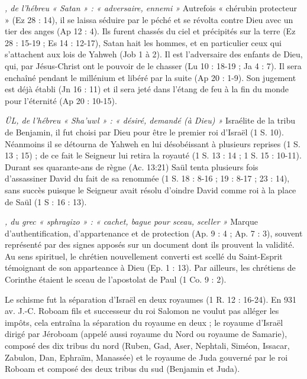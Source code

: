 \begin{multicols}{2}
\textit{, de l'hébreu « Satan » : « adversaire, ennemi »}\newline
Autrefois « chérubin protecteur » (Ez 28 : 14), il se laissa séduire par le péché et se révolta contre Dieu avec un tier des anges (Ap 12 : 4). Ils furent chassés du ciel et précipités sur la terre (Ez 28 : 15-19 ; Es 14 : 12-17), Satan hait les hommes, et en particulier ceux qui s'attachent aux lois de Yahweh (Job 1 à 2). Il est l'adversaire des enfants de Dieu, qui, par Jésus-Christ ont le pouvoir de le chasser (Lu 10 : 18-19 ; Ja 4 : 7). Il sera enchaîné pendant le millénium et libéré par la suite (Ap 20 : 1-9). Son jugement est déjà établi (Jn 16 : 11) et il sera jeté dans l'étang de feu à la fin du monde pour l'éternité (Ap 20 : 10-15).

\textit{ÜL, de l'hébreu « Sha'uwl » : « désiré, demandé (à Dieu) »}\newline
Israélite de la tribu de Benjamin, il fut choisi par Dieu pour être le premier roi d'Israël (1 S. 10). Néanmoins il se détourna de Yahweh en lui désobéissant à plusieurs reprises (1 S. 13 ; 15) ; de ce fait le Seigneur lui retira la royauté (1 S. 13 : 14 ; 1 S. 15 : 10-11). Durant ses quarante-ans de règne (Ac. 13:21) Saül tenta plusieurs fois d'assassiner David du fait de sa renommée (1 S. 18 : 8-16 ; 19 : 8-17 ; 23 : 14), sans succès puisque le Seigneur avait résolu d'oindre David comme roi à la place de Saül (1 S : 16 : 13).

\textit{, du grec « sphragizo » : « cachet, bague pour sceau, sceller »}\newline
Marque d'authentification, d'appartenance et de protection (Ap. 9 : 4 ; Ap. 7 : 3), souvent représenté par des signes apposés sur un document dont ils prouvent la validité. Au sens spirituel, le chrétien nouvellement converti est scellé du Saint-Esprit témoignant de son apparteance à Dieu (Ep. 1 : 13). Par ailleurs, les chrétiens de Corinthe étaient le sceau de l'apostolat de Paul (1 Co. 9 : 2).

\textit{}\newline
Le schisme fut la séparation d'Israël en deux royaumes (1 R. 12 : 16-24). En 931 av. J.-C. Roboam fils et successeur du roi Salomon ne voulut pas alléger les impôts, cela entraîna la séparation du royaume en deux ; le royaume d'Israël dirigé par Jéroboam (appelé aussi royaume du Nord ou royaume de Samarie), composé des dix tribus du nord (Ruben, Gad, Aser, Nephtali, Siméon, Issacar, Zabulon, Dan, Ephraïm, Manassée) et le royaume de Juda gouverné par le roi Roboam et composé des deux tribus du sud (Benjamin et Juda).


\end{multicols}
